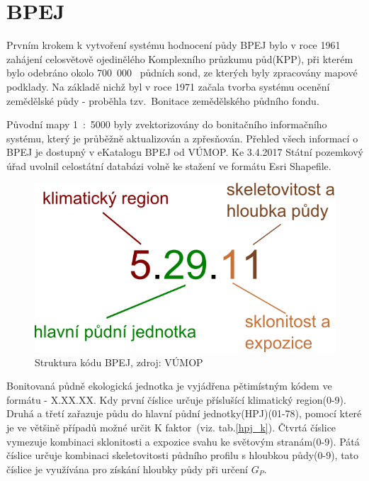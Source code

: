 \section{BPEJ}
Prvním krokem k vytvoření systému hodnocení půdy BPEJ bylo v roce 1961
zahájení celosvětově ojedinělého Komplexního průzkumu půd(KPP), při
kterém bylo odebráno okolo 700~000~ půdních sond, ze kterých byly
zpracovány mapové podklady. Na základě nichž byl v roce 1971 začala
tvorba systému ocenění zemědělské půdy - proběhla tzv.~Bonitace
zemědělského půdního fondu.

Původní mapy 1~:~5000 byly zvektorizovány do bonitačního informačního
systému, který je průběžně aktualizován a zpřesňován. Přehled všech
informací o BPEJ je dostupný v eKatalogu BPEJ od
VÚMOP\cite{bpej_vumop}. Ke 3.4.2017 Státní pozemkový úřad uvolnil
celostátní databázi volně ke stažení ve formátu Esri Shapefile\cite{spucr}.
\begin{figure}[H]
    \centering
    \includegraphics[scale=0.5]{./pictures/Struktura_BPEJ.png}
      \caption[Struktura kódu BPEJ]{Struktura kódu BPEJ, zdroj:
        VÚMOP\cite{bpej_vumop}}
      \label{fig:struktura_bpej}
\end{figure}
Bonitovaná půdně ekologická jednotka je vyjádřena pětimístným kódem ve
formátu - X.XX.XX. Kdy první číslice určuje příslušící klimatický
region(0-9). Druhá a třetí zařazuje půdu do hlavní půdní
jednotky(HPJ)(01-78), pomocí které je ve většině případů možné určit K
faktor~(viz. tab.\ref{hpj_k}). Čtvrtá číslice vymezuje kombinaci
sklonitosti a expozice svahu ke světovým stranám(0-9). Pátá číslice
určuje kombinaci skeletovitosti půdního profilu s hloubkou půdy(0-9),
tato číslice je využívána pro získání hloubky půdy při určení
$G_P$.\cite{Novotny2013}
